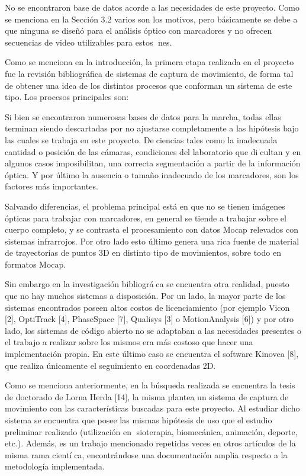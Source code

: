 No se encontraron base de datos acorde a las necesidades de este proyecto.
Como se menciona en la Sección 3.2 varios son los motivos, pero básicamente se
debe a que ninguna se diseñó para el análisis óptico con marcadores y no ofrecen
secuencias de video utilizables para estos nes.


Como se menciona en la introducción, la primera etapa realizada en el proyecto fue la revisión bibliográfica de sistemas de captura de movimiento, de forma tal de obtener una idea de los distintos procesos que conforman un sistema de este tipo. Los procesos principales son:

Si bien se encontraron numerosas bases de datos para la marcha, todas ellas
terminan siendo descartadas por no ajustarse completamente a las hipótesis bajo las
cuales se trabaja en este proyecto. Deciencias tales como la inadecuada cantidad
o posición de las cámaras, condiciones del laboratorio que dicultan y en algunos
casos imposibilitan, una correcta segmentación a partir de la información óptica.
Y por último la ausencia o tamaño inadecuado de los marcadores, son los factores
más importantes.

Salvando diferencias, el problema principal está en que no se tienen imágenes
ópticas para trabajar con marcadores, en general se tiende a trabajar sobre el
cuerpo completo, y se contrasta el procesamiento con datos Mocap relevados con
sistemas infrarrojos. Por otro lado esto último genera una rica fuente de material de
trayectorias de puntos 3D en distinto tipo de movimientos, sobre todo en formatos
Mocap.


Sin embargo en la investigación bibliográca se encuentra otra realidad, puesto
que no hay muchos sistemas a disposición. Por un lado, la mayor parte de los
sistemas encontrados poseen altos costos de licenciamiento (por ejemplo Vicon [2],
OptiTrack [4], PhaseSpace [7], Qualisys [3] o MotionAnalysis [6]) y por otro lado, los
sistemas de código abierto no se adaptaban a las necesidades presentes o el trabajo
a realizar sobre los mismos era más costoso que hacer una implementación propia.
En este último caso se encuentra el software Kinovea [8], que realiza únicamente el
seguimiento en coordenadas 2D.


Como se menciona anteriormente, en la búsqueda realizada se encuentra la
tesis de doctorado de Lorna Herda [14], la misma plantea un sistema de captura
de movimiento con las características buscadas para este proyecto. Al estudiar
dicho sistema se encuentra que posee las mismas hipótesis de uso que el estudio
preliminar realizado (utilización en sioterapia, biomecánica, animación, deporte,
etc.). Además, es un trabajo mencionado repetidas veces en otros artículos de la
misma rama cientíca, encontrándose una documentación amplia respecto a la
metodología implementada.

